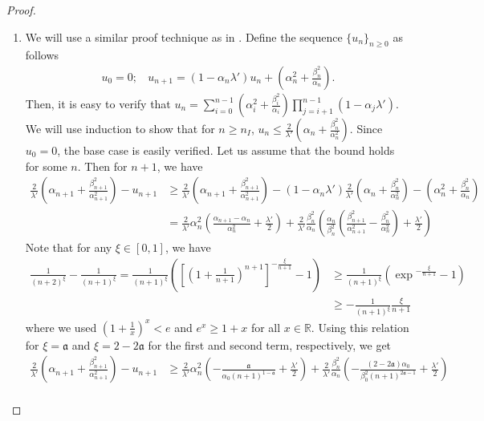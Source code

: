 \documentclass[letterpaper, 10 pt, conference]{ieeeconf}  %
\theoremstyle{definition}
\theoremstyle{plain}
\newcommand{\afrak}{\mathfrak{a}}
\begin{document}
\begin{proof}
    \begin{enumerate}
        \item We will use a similar proof technique as in \cite{chenfinite}. Define the sequence $\{u_n\}_{n\geq 0}$ as follows
        \begin{align*}
            u_0=0;~~~~u_{n+1}=(1-\alpha_n\lambda')u_n+\left(\alpha_n^2+\frac{\beta_n^2}{\alpha_n}\right).
        \end{align*}
        Then, it is easy to verify that $u_n=\sum_{i=0}^{n-1}\left(\alpha_i^2+\frac{\beta_i^2}{\alpha_i}\right)\prod_{j=i+1}^{n-1}(1-\alpha_j\lambda')$. We will use induction to show that for $n\geq n_I$, $u_n\leq\frac{2}{\lambda'}\left(\alpha_n+\frac{\beta_n^2}{\alpha_n^2}\right)$. Since $u_0=0$, the base case is easily verified. Let us assume that the bound holds for some $n$. Then for $n+1$, we have
        \begin{align*}
            \frac{2}{\lambda'}\left(\alpha_{n+1}+\frac{\beta_{n+1}^2}{\alpha_{n+1}^2}\right)-u_{n+1}&\geq \frac{2}{\lambda'}\left(\alpha_{n+1}+\frac{\beta_{n+1}^2}{\alpha_{n+1}^2}\right)-(1-\alpha_n\lambda')\frac{2}{\lambda'}\left(\alpha_n+\frac{\beta_n^2}{\alpha_n^2}\right)-\left(\alpha_n^2+\frac{\beta_n^2}{\alpha_n}\right)\\
            &=\frac{2}{\lambda'}\alpha_n^2\left(\frac{\alpha_{n+1}-\alpha_n}{\alpha_n^2}+\frac{\lambda'}{2}\right)+\frac{2}{\lambda'}\frac{\beta_n^2}{\alpha_n}\left(\frac{\alpha_n}{\beta_n^2}\left(\frac{\beta_{n+1}^2}{\alpha_{n+1}^2}-\frac{\beta_n^2}{\alpha_n^2}\right)+\frac{\lambda'}{2}\right)
        \end{align*}
        Note that for any $\xi\in[0,1]$, we have
        \begin{align*}
            \frac{1}{(n+2)^\xi}-\frac{1}{(n+1)^\xi}=\frac{1}{(n+1)^\xi}\left(\left[\left(1+\frac{1}{n+1}\right)^{n+1}\right]^{-\frac{\xi}{n+1}}-1\right)&\geq \frac{1}{(n+1)^\xi}\left(\exp{^{-\frac{\xi}{n+1}}}-1\right)\\
            &\geq -\frac{1}{(n+1)^\xi}\frac{\xi}{n+1}
        \end{align*}
        where we used $\left(1+\frac{1}{x}\right)^x<e$ and $e^x\geq 1+x$ for all $x\in \mathbb{R}$. Using this relation for $\xi=\afrak$ and $\xi=2-2\afrak$ for the first and second term, respectively, we get
        \begin{align*}
            \frac{2}{\lambda'}\left(\alpha_{n+1}+\frac{\beta_{n+1}^2}{\alpha_{n+1}^2}\right)-u_{n+1}&\geq \frac{2}{\lambda'}\alpha_n^2\left(-\frac{\afrak}{\alpha_0(n+1)^{1-\afrak}}+\frac{\lambda'}{2}\right)+\frac{2}{\lambda'}\frac{\beta_n^2}{\alpha_n}\left(-\frac{(2-2\afrak)\alpha_0}{\beta_0^2(n+1)^{2\afrak-1}}+\frac{\lambda'}{2}\right)\\

\end{align*}
\end{enumerate}
\end{proof}
\end{document}
